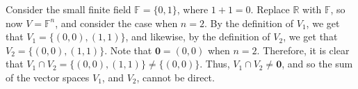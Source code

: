 \documentclass[a4paper,11pt]{article}
\newcommand{\ds}{\displaystyle}
\begin{document}
Consider the small finite field $\ds{\mathbb{F} = \{0,1\}}$, where $\ds{1+1 = 0}$. Replace $\ds{\mathbb{R}}$ with $\ds{\mathbb{F}}$, so now $\ds{V = \mathbb{F}^n}$, and consider the case when $\ds{n = 2}$. By the definition of $\ds{V_1}$, we get that $\ds{V_1 = \{(0,0), (1,1)\}}$, and likewise, by the definition of $\ds{V_2}$, we get that $\ds{V_2 = \{(0,0), (1,1)\}}$. Note that $\ds{\mathbf{0} = (0,0)}$ when $\ds{n = 2}$. Therefore, it is clear that $\ds{V_1 \cap V_2 = \{(0,0), (1,1)\} \neq \{(0,0)\}}$. Thus, $\ds{V_1 \cap V_2 \neq {\mathbf{0}}}$, and so the sum of the vector spaces $\ds{V_1}$, and $\ds{V_2}$, cannot be direct. 
\end{document}
